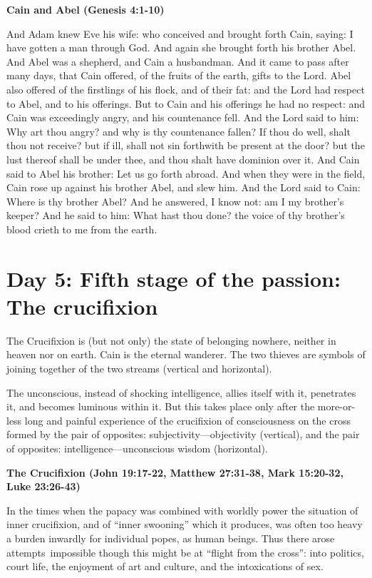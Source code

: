 \textbf{Cain and Abel (Genesis 4:1-10)}

And Adam knew Eve his wife: who conceived and brought forth Cain, saying: I have gotten a man through God. And again she brought forth his brother Abel. And Abel was a shepherd, and Cain a husbandman. And it came to pass after many days, that Cain offered, of the fruits of the earth, gifts to the Lord. Abel also offered of the firstlings of his flock, and of their fat: and the Lord had respect to Abel, and to his offerings. But to Cain and his offerings he had no respect: and Cain was exceedingly angry, and his countenance fell. And the Lord said to him: Why art thou angry? and why is thy countenance fallen? If thou do well, shalt thou not receive? but if ill, shall not sin forthwith be present at the door? but the lust thereof shall be under thee, and thou shalt have dominion over it. And Cain said to Abel his brother: Let us go forth abroad. And when they were in the field, Cain rose up against his brother Abel, and slew him. And the Lord said to Cain: Where is thy brother Abel? And he answered, I know not: am I my brother's keeper? And he said to him: What hast thou done? the voice of thy brother's blood crieth to me from the earth.

\section{Day 5: Fifth stage of the passion: The crucifixion}

The Crucifixion is (but not only) the state of belonging nowhere, neither in heaven nor on earth. Cain is the eternal wanderer. The two thieves are symbols of joining together of the two streams (vertical and horizontal).

\begin{quotex}
The unconscious, instead of shocking intelligence, allies itself with it, penetrates it, and becomes luminous within it. But this takes place only after the more-or-less long and painful experience of the crucifixion of consciousness on the cross formed by the pair of opposites: subjectivity—objectivity (vertical), and the pair of opposites: intelligence—unconscious wisdom (horizontal). 

\end{quotex}

\textbf{The Crucifixion (John 19:17-22, Matthew 27:31-38, Mark 15:20-32, Luke 23:26-43)}

\begin{quotex}
In the times when the papacy was combined with worldly power the situation of inner crucifixion, and of ``inner swooning'' which it produces, was often too heavy a burden inwardly for individual popes, as human beings. Thus there arose attempts impossible though this might be at ``flight from the cross'': into politics, court life, the enjoyment of art and culture, and the intoxications of sex. 

\end{quotex}


